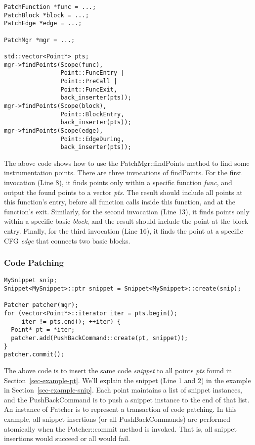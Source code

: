 \lstset{numbers=left}
\begin{lstlisting}[caption=Example of point finding]
PatchFunction *func = ...;
PatchBlock *block = ...;
PatchEdge *edge = ...;

PatchMgr *mgr = ...;

std::vector<Point*> pts;
mgr->findPoints(Scope(func),
                Point::FuncEntry | 
                Point::PreCall | 
                Point::FuncExit,
                back_inserter(pts));
mgr->findPoints(Scope(block),
                Point::BlockEntry,
                back_inserter(pts));
mgr->findPoints(Scope(edge),
                Point::EdgeDuring,
                back_inserter(pts));
\end{lstlisting}
The above code shows how to use the PatchMgr::findPoints method to find some
instrumentation points. There are three invocations of findPoints. For the first
invocation (Line 8), it finds points only within a specific function
\emph{func}, and output the found points to a vector \emph{pts}. The result
should include all points at this function's entry, before all function calls
inside this function, and at the function's exit. Similarly, for the second
invocation (Line 13), it finds points only within a specific basic \emph{block},
and the result should include the point at the block entry. Finally, for the
third invocation (Line 16), it finds the point at a specific CFG \emph{edge}
that connects two basic blocks.

\subsubsection{Code Patching}

\lstset{numbers=left}
\begin{lstlisting}[caption=Example of code patching]
MySnippet snip;
Snippet<MySnippet>::ptr snippet = Snippet<MySnippet>::create(snip);

Patcher patcher(mgr);
for (vector<Point*>::iterator iter = pts.begin();
     iter != pts.end(); ++iter) {
  Point* pt = *iter;
  patcher.add(PushBackCommand::create(pt, snippet));
}
patcher.commit();
\end{lstlisting}

The above code is to insert the same code \emph{snippet} to all points
\emph{pts} found in Section~\ref{sec-example-pt}. We'll explain the snippet
(Line 1 and 2) in the example in Section~\ref{sec-example-snip}. Each point
maintains a list of snippet instances, and the PushBackCommand is to push a
snippet instance to the end of that list. An instance of Patcher is to represent
a transaction of code patching. In this example, all snippet insertions (or all
PushBackCommands) are performed atomically when the Patcher::commit method is
invoked. That is, all snippet insertions would succeed or all would fail.

